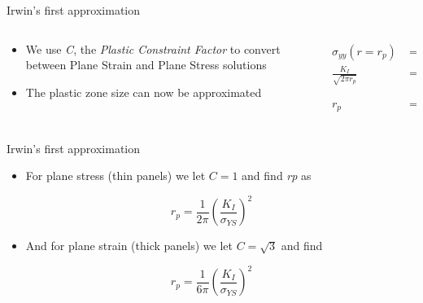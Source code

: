 \documentclass[
  letterpaper,
  ignorenonframetext,
  aspectratio=43,
  handout,
  12pt]{beamer}
\providecommand{\tightlist}{%
  \setlength{\itemsep}{0pt}\setlength{\parskip}{0pt}}
\providecommand{\tightlist}{%
\setlength{\itemsep}{0pt}\setlength{\parskip}{0pt}}
\begin{document}
\begin{frame}{Irwin's first approximation}
\protect\hypertarget{irwins-first-approximation-2}{}
\begin{columns}[T]
\begin{column}{0.5\textwidth}
\begin{itemize}
\tightlist
\item
  We use \emph{C}, the \emph{Plastic Constraint Factor} to convert
  between Plane Strain and Plane Stress solutions
\item
  The plastic zone size can now be approximated
\end{itemize}
\end{column}

\begin{column}{0.5\textwidth}
\[\begin{aligned}
  \sigma_{yy}(r=r_p) &= C\sigma_{YS}\\
  \frac{K_I}{\sqrt{2\pi r_p}} &= C\sigma_{YS}\\
  r_p &= \frac{1}{2\pi} \left(\frac{K_I}{C\sigma_{YS}}\right)^2
\end{aligned}\]
\end{column}
\end{columns}
\end{frame}

\begin{frame}{Irwin's first approximation}
\protect\hypertarget{irwins-first-approximation-3}{}
\begin{itemize}
\tightlist
\item
  For plane stress (thin panels) we let \(C=1\) and find
  \emph{r}\emph{p} as
\end{itemize}

\[r_p = \frac{1}{2\pi} \left(\frac{K_I}{\sigma_{YS}}\right)^2\]

\begin{itemize}
\tightlist
\item
  And for plane strain (thick panels) we let \(C=\sqrt{3}\) and find
\end{itemize}

\[r_p = \frac{1}{6\pi} \left(\frac{K_I}{\sigma_{YS}}\right)^2\]
\end{frame}
\end{document}
